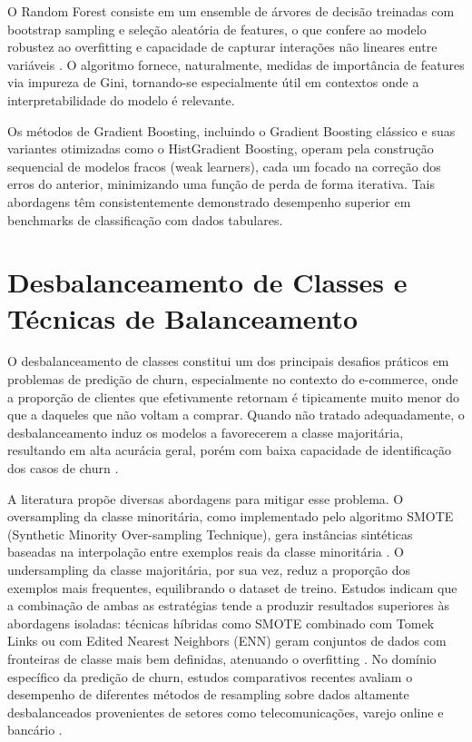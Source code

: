 O Random Forest consiste em um ensemble de árvores de decisão treinadas com bootstrap sampling e seleção aleatória de features, o que confere ao modelo robustez ao overfitting e capacidade de capturar interações não lineares entre variáveis \cite{breiman2001}. O algoritmo fornece, naturalmente, medidas de importância de features via impureza de Gini, tornando-se especialmente útil em contextos onde a interpretabilidade do modelo é relevante.

Os métodos de Gradient Boosting, incluindo o Gradient Boosting clássico \cite{friedman2001} e suas variantes otimizadas como o HistGradient Boosting, operam pela construção sequencial de modelos fracos (weak learners), cada um focado na correção dos erros do anterior, minimizando uma função de perda de forma iterativa. Tais abordagens têm consistentemente demonstrado desempenho superior em benchmarks de classificação com dados tabulares.

\FloatBarrier
\section{Desbalanceamento de Classes e Técnicas de Balanceamento} \label{sec:desbalanceamento}

O desbalanceamento de classes constitui um dos principais desafios práticos em problemas de predição de churn, especialmente no contexto do e-commerce, onde a proporção de clientes que efetivamente retornam é tipicamente muito menor do que a daqueles que não voltam a comprar. Quando não tratado adequadamente, o desbalanceamento induz os modelos a favorecerem a classe majoritária, resultando em alta acurácia geral, porém com baixa capacidade de identificação dos casos de churn \cite{he2009}.

A literatura propõe diversas abordagens para mitigar esse problema. O oversampling da classe minoritária, como implementado pelo algoritmo SMOTE (Synthetic Minority Over-sampling Technique), gera instâncias sintéticas baseadas na interpolação entre exemplos reais da classe minoritária \cite{chawla2002}. O undersampling da classe majoritária, por sua vez, reduz a proporção dos exemplos mais frequentes, equilibrando o dataset de treino. Estudos indicam que a combinação de ambas as estratégias tende a produzir resultados superiores às abordagens isoladas: técnicas híbridas como SMOTE combinado com Tomek Links ou com Edited Nearest Neighbors (ENN) geram conjuntos de dados com fronteiras de classe mais bem definidas, atenuando o overfitting \cite{batista2004}. No domínio específico da predição de churn, estudos comparativos recentes avaliam o desempenho de diferentes métodos de resampling sobre dados altamente desbalanceados provenientes de setores como telecomunicações, varejo online e bancário \cite{haddadi2024}.

